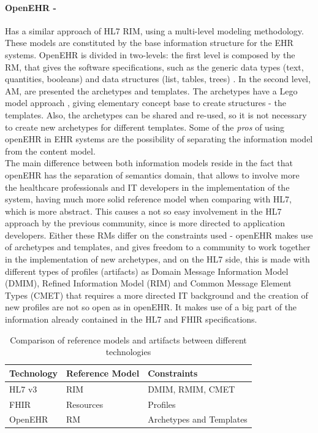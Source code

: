 \documentclass[mim_thesis.tex]{subfiles}
\begin{document}
\paragraph{\textbf{OpenEHR -}}
Has a similar approach of HL7 RIM, using a multi-level modeling methodology. These models are constituted by the base information structure for the EHR systems. OpenEHR is divided in two-levels: the first level is composed by the \ac{RM}, that gives the software specifications, such as the generic data types (text, quantities, booleans) and data structures (list, tables, trees) \citep{sinha2012electronic}\citep{cresswell2013ten}. In the second level, \ac{AM}, are presented the archetypes and templates. The archetypes have a Lego\texttrademark{ } model approach \citep{openEHRlego}, giving elementary concept base to create structures - the templates. Also, the archetypes can be shared and re-used, so it is not necessary to create new archetypes for different templates. Some of the \textit{pros} of using openEHR in EHR systems are the possibility of separating the information model from the content model.\\

The main difference between both information models reside in the fact that openEHR has the separation of semantics domain, that allows to involve more the healthcare professionals and IT developers in the implementation of the system, having much more solid reference model when comparing with HL7, which is more abstract. This causes a not so easy involvement in the HL7 approach by the previous community, since is more directed to application developers. Either these RMs differ on the constraints used - openEHR makes use of archetypes and templates, and gives freedom to a community to work together in the implementation of new archetypes, and on the HL7 side, this is made with different types of profiles (artifacts) as Domain Message Information Model (DMIM), Refined Information Model (RIM) and Common Message Element Types (CMET) \citep{Grieve2016vid} that requires a more directed IT background and the creation of new profiles are not so open as in openEHR. It makes use of a big part of the information already contained in the HL7 and FHIR specifications. \\



\begin{table}[h]
\centering
	\caption{Comparison of reference models and artifacts between different technologies \citep{Grieve2016vid}}
	\label{tab:RM_comparision}
	\begin{tabular}{lll}
		\toprule[2pt]
		\cmidrule(r){1-2}
		\textbf{Technology}    & \textbf{Reference Model} & \textbf{Constraints} \\
		\midrule[2pt]
		HL7 v3  & RIM & DMIM, RMIM, CMET \\
		\midrule
		FHIR & Resources & Profiles \\
		\midrule
		OpenEHR & RM & Archetypes and Templates \\
		\bottomrule[2pt]
\end{tabular}
\end{table}
\end{document}
